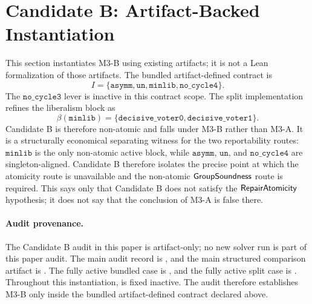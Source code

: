 \section{Candidate B: Artifact-Backed Instantiation}
\label{sec:candidate-b}

This section instantiates M3-B using existing artifacts; it is not a Lean
formalization of those artifacts.  The bundled artifact-defined contract is
\[
  I =
  \{\mathtt{asymm},\mathtt{un},\mathtt{minlib},\mathtt{no\_cycle4}\}.
\]
The \(\mathtt{no\_cycle3}\) lever is inactive in this contract scope.  The split
implementation refines the liberalism block as
\[
  \beta(\mathtt{minlib})
  =
  \{\mathtt{decisive\_voter0},\mathtt{decisive\_voter1}\}.
\]
Candidate B is therefore non-atomic and falls under M3-B rather than M3-A.
It is a structurally economical separating witness for the two reportability
routes: \(\mathtt{minlib}\) is the only non-atomic active block, while
\(\mathtt{asymm}\), \(\mathtt{un}\), and \(\mathtt{no\_cycle4}\) are
singleton-aligned.  Candidate B therefore isolates the precise point at which
the atomicity route is unavailable and the non-atomic \(\mathsf{GroupSoundness}\)
route is required.  This says only that Candidate B does not satisfy the
\(\mathsf{RepairAtomicity}\) hypothesis; it does not say that the conclusion of M3-A
is false there.

\paragraph{Audit provenance.}
The Candidate B audit in this paper is artifact-only; no new solver run is part of this
paper audit.  The main audit record is
, and the main
structured comparison artifact is
.
The fully active bundled case is
, and the fully active split case is
.  Throughout this instantiation,
 is fixed inactive.  The audit therefore establishes M3-B
only inside the bundled artifact-defined contract declared above.

